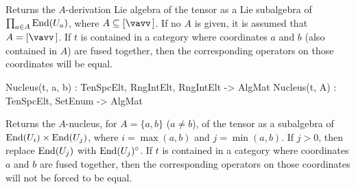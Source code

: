 Returns the $A$-derivation Lie algebra of the tensor as a Lie subalgebra of $\prod_{a\in A}\operatorname{End}(U_a)$, where $A\subseteq [\vav]$.
If no $A$ is given, it is assumed that $A=[\vav]$. 
If $t$ is contained in a category where coordinates $a$ and $b$ (also contained in $A$) are fused together, then the corresponding operators on those coordinates will be equal.

\begin{intrinsics}
Nucleus(t, a, b) : TenSpcElt, RngIntElt, RngIntElt -> AlgMat
Nucleus(t, A) : TenSpcElt, SetEnum -> AlgMat
\end{intrinsics}

Returns the $A$-nucleus, for $A=\{a,b\}$ ($a\ne b$), of the tensor as a subalgebra of $\operatorname{End}(U_i)\times \operatorname{End}(U_j)$, 
where $i=\max(a,b)$ and $j=\min(a,b)$.
If $j>0$, then replace $\operatorname{End}(U_j)$ with $\operatorname{End}(U_j)^\circ$. 
If $t$ is contained in a category where coordinates $a$ and $b$ are fused together, then the corresponding operators on those coordinates will not be forced to be equal.

